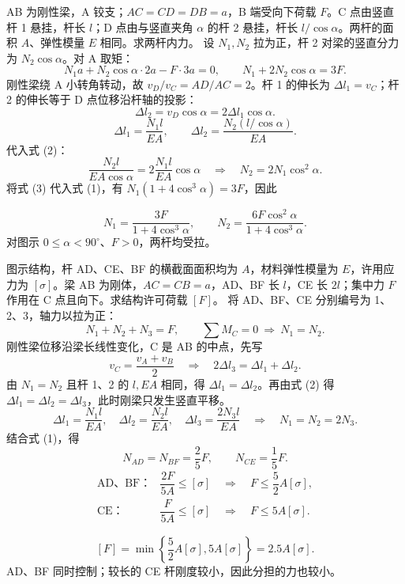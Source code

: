 \documentclass[a4paper,10pt,fontset=none]{ctexart}
\begin{document}
AB 为刚性梁，A 铰支；$AC=CD=DB=a$，B 端受向下荷载 $F$。C 点由竖直杆 1 悬挂，杆长 $l$；D 点由与竖直夹角 $\alpha$ 的杆 2 悬挂，杆长 $l/\cos\alpha$。两杆的面积 $A$、弹性模量 $E$ 相同。求两杆内力。
设 $N_1,N_2$ 拉为正，杆 2 对梁的竖直分力为 $N_2\cos\alpha$。对 A 取矩：
\[
N_1a+N_2\cos\alpha\cdot2a-F\cdot3a=0,
\qquad N_1+2N_2\cos\alpha=3F. \tag{1}
\]
刚性梁绕 A 小转角转动，故 $v_D/v_C=AD/AC=2$。杆 1 的伸长为 $\Delta l_1=v_C$；杆 2 的伸长等于 D 点位移沿杆轴的投影：
\[
\Delta l_2=v_D\cos\alpha=2\Delta l_1\cos\alpha. \tag{2}
\]
\[
\Delta l_1=\frac{N_1l}{EA},\qquad
\Delta l_2=\frac{N_2(l/\cos\alpha)}{EA}.
\]
代入式 (2)：
\[
\frac{N_2l}{EA\cos\alpha}=2\frac{N_1l}{EA}\cos\alpha
\quad\Longrightarrow\quad N_2=2N_1\cos^2\alpha. \tag{3}
\]
将式 (3) 代入式 (1)，有 $N_1(1+4\cos^3\alpha)=3F$，因此
\begin{answerbox}
\[
\boxed{N_1=\frac{3F}{1+4\cos^3\alpha}},\qquad
\boxed{N_2=\frac{6F\cos^2\alpha}{1+4\cos^3\alpha}}.
\]
对图示 $0\le\alpha<90^\circ$、$F>0$，两杆均受拉。
\end{answerbox}

图示结构，杆 AD、CE、BF 的横截面面积均为 $A$，材料弹性模量为 $E$，许用应力为 $[\sigma]$。梁 AB 为刚体，$AC=CB=a$，AD、BF 长 $l$，CE 长 $2l$；集中力 $F$ 作用在 C 点且向下。求结构许可荷载 $[F]$。
将 AD、BF、CE 分别编号为 1、2、3，轴力以拉为正：
\[
N_1+N_2+N_3=F,\qquad \sum M_C=0\ \Longrightarrow\ N_1=N_2. \tag{1}
\]
刚性梁位移沿梁长线性变化，C 是 AB 的中点，先写
\[
v_C=\frac{v_A+v_B}{2}
\quad\Longrightarrow\quad 2\Delta l_3=\Delta l_1+\Delta l_2. \tag{2}
\]
由 $N_1=N_2$ 且杆 1、2 的 $l,EA$ 相同，得 $\Delta l_1=\Delta l_2$。再由式 (2) 得
$\Delta l_1=\Delta l_2=\Delta l_3$，此时刚梁只发生竖直平移。
\[
\Delta l_1=\frac{N_1l}{EA},\quad
\Delta l_2=\frac{N_2l}{EA},\quad
\Delta l_3=\frac{2N_3l}{EA}
\quad\Longrightarrow\quad N_1=N_2=2N_3.
\]
结合式 (1)，得
\[
\boxed{N_{AD}=N_{BF}=\frac25F},\qquad
\boxed{N_{CE}=\frac15F}.
\]
\[
\begin{array}{ll}
\text{AD、BF：}&\dfrac{2F}{5A}\le[\sigma]\quad\Longrightarrow\quad F\le\dfrac52A[\sigma],\\[5pt]
\text{CE：}&\dfrac{F}{5A}\le[\sigma]\quad\Longrightarrow\quad F\le5A[\sigma].
\end{array}
\]
\begin{answerbox}
\[
\boxed{[F]=\min\left\{\frac52A[\sigma],5A[\sigma]\right\}=2.5A[\sigma]}.
\]
AD、BF 同时控制；较长的 CE 杆刚度较小，因此分担的力也较小。
\end{answerbox}
\end{document}
